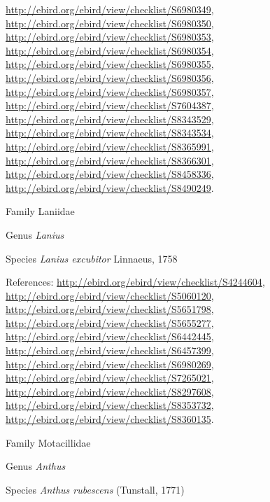 \documentclass[9pt, article]{memoir}
\begin{document}
\begin{multicols}{2}
\url{http://ebird.org/ebird/view/checklist/S6980349}, 
\url{http://ebird.org/ebird/view/checklist/S6980350}, 
\url{http://ebird.org/ebird/view/checklist/S6980353}, 
\url{http://ebird.org/ebird/view/checklist/S6980354}, 
\url{http://ebird.org/ebird/view/checklist/S6980355}, 
\url{http://ebird.org/ebird/view/checklist/S6980356}, 
\url{http://ebird.org/ebird/view/checklist/S6980357}, 
\url{http://ebird.org/ebird/view/checklist/S7604387}, 
\url{http://ebird.org/ebird/view/checklist/S8343529}, 
\url{http://ebird.org/ebird/view/checklist/S8343534}, 
\url{http://ebird.org/ebird/view/checklist/S8365991}, 
\url{http://ebird.org/ebird/view/checklist/S8366301}, 
\url{http://ebird.org/ebird/view/checklist/S8458336}, 
\url{http://ebird.org/ebird/view/checklist/S8490249}.

\vspace{6pt}\noindent\hspace{24pt}Family Laniidae


\vspace{6pt}\noindent\hspace{30pt}Genus \textit{Lanius}


\vspace{6pt}\noindent\hspace{36pt}Species \textit{Lanius excubitor} Linnaeus, 1758


\vspace{6pt}References: 
\url{http://ebird.org/ebird/view/checklist/S4244604}, 
\url{http://ebird.org/ebird/view/checklist/S5060120}, 
\url{http://ebird.org/ebird/view/checklist/S5651798}, 
\url{http://ebird.org/ebird/view/checklist/S5655277}, 
\url{http://ebird.org/ebird/view/checklist/S6442445}, 
\url{http://ebird.org/ebird/view/checklist/S6457399}, 
\url{http://ebird.org/ebird/view/checklist/S6980269}, 
\url{http://ebird.org/ebird/view/checklist/S7265021}, 
\url{http://ebird.org/ebird/view/checklist/S8297608}, 
\url{http://ebird.org/ebird/view/checklist/S8353732}, 
\url{http://ebird.org/ebird/view/checklist/S8360135}.

\vspace{6pt}\noindent\hspace{24pt}Family Motacillidae


\vspace{6pt}\noindent\hspace{30pt}Genus \textit{Anthus}


\vspace{6pt}\noindent\hspace{36pt}Species \textit{Anthus rubescens} (Tunstall, 1771)



\end{multicols}
\end{document}
